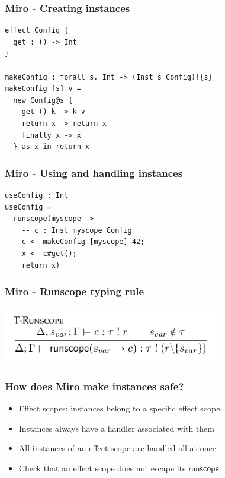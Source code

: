 \documentclass{beamer}
\begin{document}
\begin{frame}[fragile]\frametitle{Miro - Creating instances}
\begin{example}
\begin{verbatim}
effect Config {
  get : () -> Int
}

makeConfig : forall s. Int -> (Inst s Config)!{s}
makeConfig [s] v =
  new Config@s {
    get () k -> k v
    return x -> return x
    finally x -> x
  } as x in return x
\end{verbatim}
\end{example}
\end{frame}

\begin{frame}[fragile]\frametitle{Miro - Using and handling instances}
\begin{example}
\begin{verbatim}
useConfig : Int
useConfig =
  runscope(myscope ->
    -- c : Inst myscope Config
    c <- makeConfig [myscope] 42;
    x <- c#get();
    return x)
\end{verbatim}
\end{example}
\end{frame}

\begin{frame}[fragile]\frametitle{Miro - Runscope typing rule}
\begin{center}
\includegraphics[width=270pt]{images/typing-rule.png}
\end{center}
\end{frame}

\begin{frame}[fragile]\frametitle{How does Miro make instances safe?}
\begin{itemize}
\item Effect scopes: instances belong to a specific effect scope
\item Instances always have a handler associated with them
\item All instances of an effect scope are handled all at once
\item Check that an effect scope does not escape its $\mathsf{runscope}$
\end{itemize}
\end{frame}
\end{document}
